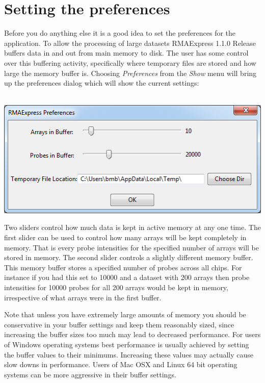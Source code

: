 \documentclass[11pt]{report}
\newcommand{\curversion}{1.1.0 Release }
\begin{document}
\section{Setting the preferences}

Before you do anything else it is a good idea to set the preferences for the application. To allow the processing of large datasets RMAExpress \curversion buffers data in and out from main memory to disk. The user has some control over this buffering activity, specifically where temporary files are stored and how large the memory buffer is. Choosing {\it Preferences} from the {\it Show} menu will bring up the preferences dialog which will show the current settings: \\ \\
\begin{center}
\includegraphics[scale=0.5]{preferenceswindow}
\end{center}
Two sliders control how much data is kept in active memory at any one time. The first slider can be used to control how many arrays will be kept completely in memory. That is every probe intensities for the specified number of arrays will be stored in memory. The second slider controls a slightly different memory buffer. This memory buffer stores a specified number of probes across all chips. For instance if you had this set to 10000 and a dataset with 200 arrays then probe intensities for 10000 probes for all 200 arrays would be kept in memory, irrespective of what arrays were in the first buffer. 

Note that unless you have extremely large amounts of memory you should be conservative in your buffer settings and keep them reasonably sized, since increasing the buffer sizes too much may lead to decreased performance. For users of Windows operating systems best performance is usually achieved by setting the buffer values to their minimums. Increasing these values may actually cause slow downs in performance. Users of Mac OSX and Linux 64 bit operating systems can be more aggressive in their buffer settings.
\end{document}
